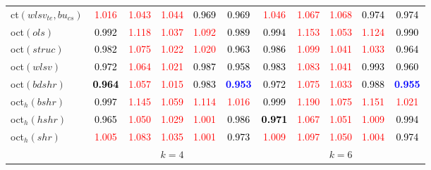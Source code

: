\begin{tabular}[t]{l|>{}cccc>{}c|ccccc}
ct$(wlsv_{te}, bu_{cs})$ & \textcolor{red}{1.016} & \textcolor{red}{1.043} & \textcolor{red}{1.044} & \textcolor{black}{0.969} & \textcolor{black}{0.969} & \textcolor{red}{1.046} & \textcolor{red}{1.067} & \textcolor{red}{1.068} & \textcolor{black}{0.974} & \textcolor{black}{0.974}\\
oct$(ols)$ & \textcolor{black}{0.992} & \textcolor{red}{1.118} & \textcolor{red}{1.037} & \textcolor{red}{1.092} & \textcolor{black}{0.989} & \textcolor{black}{0.994} & \textcolor{red}{1.153} & \textcolor{red}{1.053} & \textcolor{red}{1.124} & \textcolor{black}{0.990}\\
oct$(struc)$ & \textcolor{black}{0.982} & \textcolor{red}{1.075} & \textcolor{red}{1.022} & \textcolor{red}{1.020} & \textcolor{black}{0.963} & \textcolor{black}{0.986} & \textcolor{red}{1.099} & \textcolor{red}{1.041} & \textcolor{red}{1.033} & \textcolor{black}{0.964}\\
oct$(wlsv)$ & \textcolor{black}{0.972} & \textcolor{red}{1.064} & \textcolor{red}{1.021} & \textcolor{black}{0.987} & \textcolor{black}{0.958} & \textcolor{black}{0.983} & \textcolor{red}{1.083} & \textcolor{red}{1.041} & \textcolor{black}{0.993} & \textcolor{black}{0.960}\\
oct$(bdshr)$ & \textcolor{black}{\textbf{0.964}} & \textcolor{red}{1.057} & \textcolor{red}{1.015} & \textcolor{black}{0.983} & \textcolor{blue}{\textbf{0.953}} & \textcolor{black}{0.972} & \textcolor{red}{1.075} & \textcolor{red}{1.033} & \textcolor{black}{0.988} & \textcolor{blue}{\textbf{0.955}}\\
oct$_h(bshr)$ & \textcolor{black}{0.997} & \textcolor{red}{1.145} & \textcolor{red}{1.059} & \textcolor{red}{1.114} & \textcolor{red}{1.016} & \textcolor{black}{0.999} & \textcolor{red}{1.190} & \textcolor{red}{1.075} & \textcolor{red}{1.151} & \textcolor{red}{1.021}\\
oct$_h(hshr)$ & \textcolor{black}{0.965} & \textcolor{red}{1.050} & \textcolor{red}{1.029} & \textcolor{red}{1.001} & \textcolor{black}{0.986} & \textcolor{black}{\textbf{0.971}} & \textcolor{red}{1.067} & \textcolor{red}{1.051} & \textcolor{red}{1.009} & \textcolor{black}{0.994}\\
oct$_h(shr)$ & \textcolor{red}{1.005} & \textcolor{red}{1.083} & \textcolor{red}{1.035} & \textcolor{red}{1.001} & \textcolor{black}{0.973} & \textcolor{red}{1.009} & \textcolor{red}{1.097} & \textcolor{red}{1.050} & \textcolor{red}{1.004} & \textcolor{black}{0.974}\\
\addlinespace[0.3em]
\multicolumn{1}{c}{} & \multicolumn{5}{c}{\textbf{$k = 4$}} & \multicolumn{5}{c}{\textbf{$k = 6$}}\\

\end{tabular}

